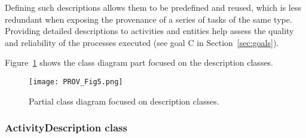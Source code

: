 Defining such descriptions allows them to be predefined and reused, which is less redundant when exposing the provenance of a series of tasks of the same type. 
Providing detailed descriptions to activities and entities help assess the quality and reliability of the processes executed (see goal C in Section~\ref{sec:goals}).

Figure~\ref{fig:classdiagram_descriptions} shows the class diagram part focused on the description classes.

\begin{figure}[ht]
\centering
\texttt{[image: PROV\_Fig5.png]}
\caption[Partial class diagram focused on description classes.]{Partial class diagram focused on description classes.}
\label{fig:classdiagram_descriptions}
\end{figure}








\subsubsection{ActivityDescription class}
\label{sec:activity_desc}


